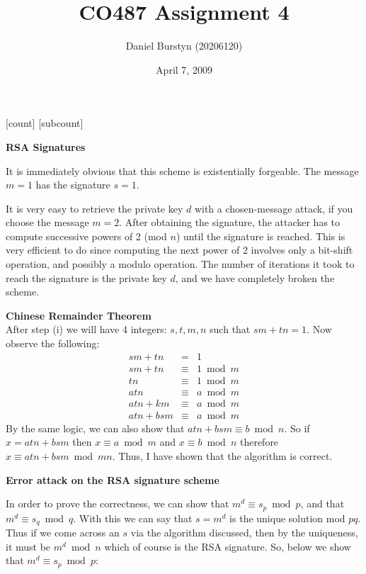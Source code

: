\documentclass[12pt]{article}
\title{CO487 Assignment 4}
\author{Daniel Burstyn (20206120)}
\date{April 7, 2009}
\begin{document}
\maketitle
{}
[count]
[subcount]
\begin{list}{.}{}

\item \textbf{RSA Signatures}
\begin{list}{)}{}

\item It is immediately obvious that this scheme is existentially forgeable.
The message $m=1$ has the signature $s=1$.

\item It is very easy to retrieve the private key $d$ with a chosen-message
attack, if you choose the message $m=2$.  After obtaining the signature, the
attacker has to compute successive powers of 2 (mod $n$) until the signature is
reached.  This is very efficient to do since computing the next power of 2
involves only a bit-shift operation, and possibly a modulo operation.  The
number of iterations it took to reach the signature is the private key $d$, and
we have completely broken the scheme.

\end{list}

\item \textbf{Chinese Remainder Theorem}\\
After step (i) we will have 4 integers: $s,t,m,n$ such that $sm+tn=1$.  Now
observe the following:\\
\begin{eqnarray*}
sm+tn &=& 1\\
sm+tn &\equiv& 1 \bmod m\\
tn &\equiv& 1 \bmod m\\
atn &\equiv& a \bmod m\\
atn+km &\equiv& a \bmod m\\
atn+bsm &\equiv& a \bmod m
\end{eqnarray*}
By the same logic, we can also show that $atn+bsm \equiv b \bmod n$.  So if $x =
atn+bsm$ then $x \equiv a \bmod m$ and $x \equiv b \bmod n$ therefore $x \equiv
atn+bsm \bmod mn$.  Thus, I have shown that the algorithm is correct.

\item \textbf{Error attack on the RSA signature scheme}
\begin{list}{)}{}
\item In order to prove the correctness, we can show that $m^d \equiv s_p \bmod
p$, and that $m^d \equiv s_q \bmod q$.  With this we can say that $s = m^d$ is
the unique solution mod $pq$.  Thus if we come across an $s$ via the algorithm
discussed, then by the uniqueness, it must be $m^d \bmod n$ which of course is
the RSA signature.  So, below we show that $m^d \equiv s_p \bmod p$:\\


\end{list}
\end{list}
\end{document}
